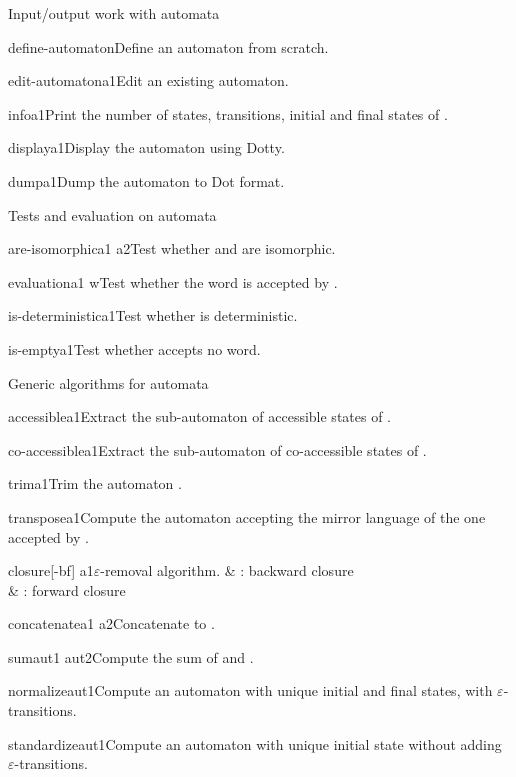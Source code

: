 \begin{fnsection}{Input/output work with automata}
\item{define-automaton}{}{Define an automaton from scratch.}
\item{edit-automaton}{a1}{Edit an existing automaton.}
\item{info}{a1}{Print the number of states, transitions, initial and
    final states of .}
\item{display}{a1}{Display the automaton using Dotty.}
\item{dump}{a1}{Dump the automaton to Dot format.}  \hline
\end{fnsection}

\begin{fnsection}{Tests and evaluation on automata}
\item{are-isomorphic}{a1 a2}{Test whether  and  are
    isomorphic.}
\item{evaluation}{a1 w}{Test whether the word  is accepted by
    .}
\item{is-deterministic}{a1}{Test whether  is deterministic.}
\item{is-empty}{a1}{Test whether  accepts no word.}  \hline
\end{fnsection}

\begin{fnsection}{Generic algorithms for automata}
\item{accessible}{a1}{Extract the sub-automaton of accessible states
    of .}
\item{co-accessible}{a1}{Extract the sub-automaton of co-accessible
    states of .}
\item{trim}{a1}{Trim the automaton .}
\item{transpose}{a1}{Compute the automaton accepting the mirror
    language of the one accepted by .}

\item{closure}{[-bf] a1}{$\varepsilon$-removal algorithm.}
  &  : backward closure\\
  &  : forward closure\\
\item{concatenate}{a1 a2}{Concatenate  to .}
\item{sum}{aut1 aut2}{Compute the sum of  and .}
\item{normalize}{aut1}{Compute an automaton with unique initial and
    final states, with $\varepsilon$-transitions.}
\item{standardize}{aut1}{Compute an automaton with unique initial
    state without adding $\varepsilon$-transitions.}  \hline
\end{fnsection}

